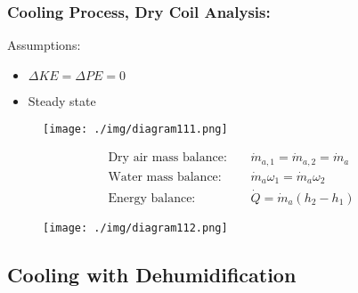 \subsubsection{Cooling Process, Dry Coil Analysis:}
Assumptions:
\begin{itemize}[noitemsep]
  \item $\Delta KE = \Delta PE = 0$
  \item Steady state
\end{itemize}
\begin{figure}[H]
  \centering
  \texttt{[image: ./img/diagram111.png]}
  \caption{}
\end{figure}
\begin{align}
  \text{Dry air mass balance:} \ \ \ \ \  & \dot{m}_{a,1} = \dot{m}_{a,2} = \dot{m}_{a} \\[5pt]
  \text{Water mass balance:} \ \ \ \ \    & \dot{m}_{a}\omega_1 = \dot{m}_{a}\omega_2   \\[5pt]
  \text{Energy balance:} \ \ \ \ \        & \dot{Q} = \dot{m}_{a}(h_2-h_1)
\end{align}
\begin{figure}[H]
  \centering
  \texttt{[image: ./img/diagram112.png]}
  \caption{}
\end{figure}
\subsection*{Cooling with Dehumidification}
